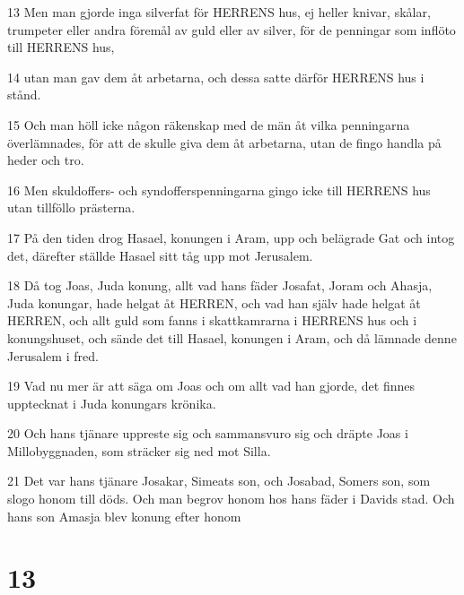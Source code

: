 \par 13 Men man gjorde inga silverfat för HERRENS hus, ej heller knivar, skålar, trumpeter eller andra föremål av guld eller av silver, för de penningar som inflöto till HERRENS hus,
\par 14 utan man gav dem åt arbetarna, och dessa satte därför HERRENS hus i stånd.
\par 15 Och man höll icke någon räkenskap med de män åt vilka penningarna överlämnades, för att de skulle giva dem åt arbetarna, utan de fingo handla på heder och tro.
\par 16 Men skuldoffers- och syndofferspenningarna gingo icke till HERRENS hus utan tillföllo prästerna.
\par 17 På den tiden drog Hasael, konungen i Aram, upp och belägrade Gat och intog det, därefter ställde Hasael sitt tåg upp mot Jerusalem.
\par 18 Då tog Joas, Juda konung, allt vad hans fäder Josafat, Joram och Ahasja, Juda konungar, hade helgat åt HERREN, och vad han själv hade helgat åt HERREN, och allt guld som fanns i skattkamrarna i HERRENS hus och i konungshuset, och sände det till Hasael, konungen i Aram, och då lämnade denne Jerusalem i fred.
\par 19 Vad nu mer är att säga om Joas och om allt vad han gjorde, det finnes upptecknat i Juda konungars krönika.
\par 20 Och hans tjänare uppreste sig och sammansvuro sig och dräpte Joas i Millobyggnaden, som sträcker sig ned mot Silla.
\par 21 Det var hans tjänare Josakar, Simeats son, och Josabad, Somers son, som slogo honom till döds. Och man begrov honom hos hans fäder i Davids stad. Och hans son Amasja blev konung efter honom

\chapter{13}

